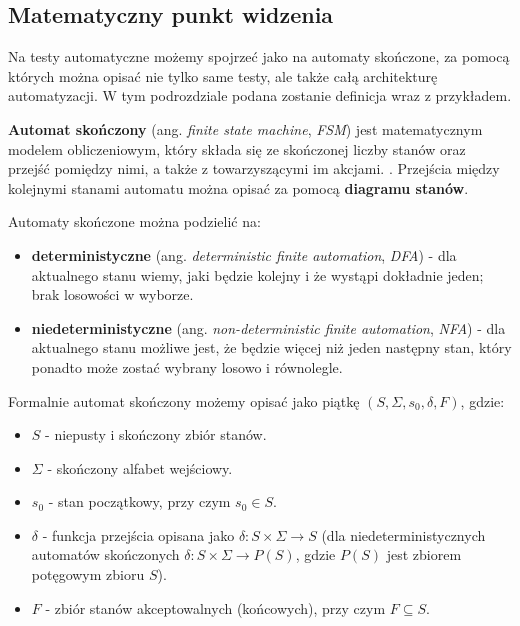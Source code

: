 \subsection{Matematyczny punkt widzenia}

Na testy automatyczne możemy spojrzeć jako na automaty skończone, za pomocą których można opisać nie tylko same testy, ale także całą architekturę automatyzacji. W tym podrozdziale podana zostanie definicja wraz z przykładem.

\begin{df}
\textbf{Automat skończony} (ang. \textit{finite state machine}, \textit{FSM}) jest matematycznym modelem obliczeniowym, który składa się ze skończonej liczby stanów oraz przejść pomiędzy nimi, a także z towarzyszącymi im akcjami. \cite{auto}. Przejścia między kolejnymi stanami automatu można opisać za pomocą \textbf{diagramu stanów}.

\newpage

\noindent Automaty skończone można podzielić na:
\begin{itemize}
    \item \textbf{deterministyczne} (ang. \textit{deterministic finite automation}, \textit{DFA}) - dla aktualnego stanu wiemy, jaki będzie kolejny i że wystąpi dokładnie jeden; brak losowości w wyborze.
    \item \textbf{niedeterministyczne} (ang. \textit{non-deterministic finite automation}, \textit{NFA}) - dla aktualnego stanu możliwe jest, że będzie więcej niż jeden następny stan, który ponadto może zostać wybrany losowo i równolegle.
\end{itemize}


\noindent Formalnie automat skończony możemy opisać jako piątkę $(S,\Sigma, s_0, \delta, F)$, gdzie:
\begin{itemize}
    \item $S$ - niepusty i skończony zbiór stanów.
    \item $\Sigma$ - skończony alfabet wejściowy.
    \item $s_0$ - stan początkowy, przy czym $s_0 \in S$.
    \item $\delta$ - funkcja przejścia opisana jako $\delta: S \times \Sigma \rightarrow S$ (dla niedeterministycznych automatów skończonych $\delta: S \times \Sigma \rightarrow P(S)$, gdzie $P(S)$ jest zbiorem potęgowym zbioru $S$).
    \item $F$ - zbiór stanów akceptowalnych (końcowych), przy czym $F \subseteq S$.
\end{itemize}


\end{df}
